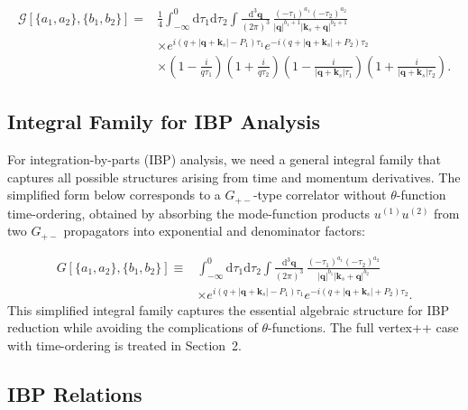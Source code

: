 \documentclass[a4paper,12pt]{article}
\def\di{{\mathrm{d}}}
\begin{document}
\begin{equation}
	\begin{split}
		\mathcal{G}[\{a_1,a_2\},\{b_1,b_2\}] = & \frac{1}{4} \int_{-\infty}^0 \di\tau_1\di\tau_2 \int \frac{\di^3\bm q}{(2\pi)^3} \,
		\frac{(-\tau_1)^{a_1}(-\tau_2)^{a_2}}{|\bm q|^{b_1+1}|\bm k_s+\bm q|^{b_2+1}}                                                \\
		                                       & \times e^{i(q+|\bm q+\bm k_s|-P_1)\tau_1} e^{-i(q+|\bm q+\bm k_s|+P_2)\tau_2}       \\
		                                       & \times \left(1 - \frac{i}{q\tau_1}\right)\left(1 + \frac{i}{q\tau_2}\right)
		\left(1 - \frac{i}{|\bm q+\bm k_s|\tau_1}\right)\left(1 + \frac{i}{|\bm q+\bm k_s|\tau_2}\right).
	\end{split}
\end{equation}

\subsection{Integral Family for IBP Analysis}

For integration-by-parts (IBP) analysis, we need a general integral family that captures all possible structures arising from time and momentum derivatives. The simplified form below corresponds to a $G_{+-}$-type correlator without $\theta$-function time-ordering, obtained by absorbing the mode-function products $u^{(1)}u^{(2)}$ from two $G_{+-}$ propagators into exponential and denominator factors:

\begin{equation}
	\begin{split}
		G[\{a_1,a_2\},\{b_1,b_2\}] \equiv & \int_{-\infty}^0 \di\tau_1\di\tau_2 \int \frac{\di^3\bm q}{(2\pi)^3} \,
		\frac{(-\tau_1)^{a_1}(-\tau_2)^{a_2}}{|\bm q|^{b_1}|\bm k_s+\bm q|^{b_2}}                                          \\
		                                  & \times e^{i(q+|\bm q+\bm k_s|-P_1)\tau_1} e^{-i(q+|\bm q+\bm k_s|+P_2)\tau_2}.
	\end{split}
\end{equation}
This simplified integral family captures the essential algebraic structure for IBP reduction while avoiding the complications of $\theta$-functions. The full vertex++ case with time-ordering is treated in Section~2.


\subsection{IBP Relations}
\end{document}
